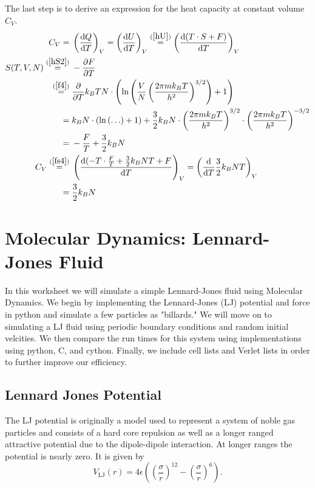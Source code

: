 \documentclass[11pt,a4paper]{scrartcl}
\newcommand{\diff}[2]{\frac{\text{d} #1}{\text{d} #2}}	%
\newcommand{\pdiff}[2]{\frac{\partial #1}{\partial #2}} %
\newcommand{\Ln}[1]{\text{ln}\left( #1 \right)}			%
\newcommand{\eref}[1]{(\ref{#1})}						%
\begin{document}
The last step is to derive an expression for the heat capacity at constant volume $C_V$. 
\begin{align}
C_V 
	=&\; \left(\diff{Q}{T}\right)_V
	=\left(\diff{U}{T}\right)_V
	\stackrel{\eref{hU}}{=} \left(\diff{(T\cdot S+F)}{T}\right)_V
	\label{cv1}\\
S(T,V,N)
	\stackrel{\eref{hS2}}{=}&\; -\pdiff{F}{T}
	\label{fs1}\\
\stackrel{\eref{f4}}{=}&\; \pdiff{ }{T} k_BTN\cdot\left(\Ln{\frac{V}{N}\left(\frac{2\pi mk_BT}{h^2}\right)^{3/2}}+1\right)
	\label{fs2}\\
=&\; k_BN\cdot\left(\Ln{\ldots}+1\right)
	+ \frac{3}{2}k_BN\cdot\left(\frac{2\pi mk_BT}{h^2}\right)^{3/2}\cdot\left(\frac{2\pi mk_BT}{h^2}\right)^{-3/2}
	\label{fs3}\\
=&\; -\frac{F}{T} + \frac{3}{2}k_BN
	\label{fs4}\\
C_V
	\stackrel{\eref{fs4}}{=}&\; \left(\diff{(-T\cdot\frac{F}{T}+\frac{3}{2}k_BNT+F}{T}\right)_V
	=\left(\diff{}{T}\frac{3}{2}k_BNT\right)_V
	\label{cv2}\\
=&\; \frac{3}{2}k_BN
	\label{cv3}
\end{align}

\section{Molecular Dynamics: Lennard-Jones Fluid}
In this worksheet we will simulate a simple Lennard-Jones fluid using Molecular Dynamics.  We begin by implementing the Lennard-Jones (LJ) potential and force in python and simulate a few particles as "billards." We will move on to simulating a LJ fluid using periodic boundary conditions and random initial velcities. We then compare the run times for this system using implementations using python, C, and cython. Finally, we include cell lists and Verlet lists in order to further improve our efficiency.
\subsection{Lennard Jones Potential}
The LJ potential is originally a model used to represent a system of noble gas particles and consists of a hard core repulsion as well as a longer ranged attractive potential due to the dipole-dipole interaction. At longer ranges the potential is nearly zero. It is given by
\begin{equation}
V_\mathrm{LJ}(r) = 4\epsilon\left(\left(\frac{\sigma}{r}\right)^{12} - \left(\frac{\sigma}{r}\right)^6\right).
\end{equation}
\end{document}
